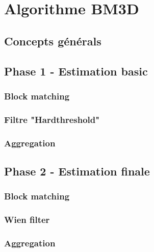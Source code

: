 
\chapter{Algorithme BM3D}

\section{Concepts générals}


\section{Phase 1 - Estimation basic}
\subsection{Block matching}
\subsection{Filtre "Hardthreshold"}
\subsection{Aggregation}

\section{Phase 2 - Estimation finale}
\subsection{Block matching}
\subsection{Wien filter}
\subsection{Aggregation}